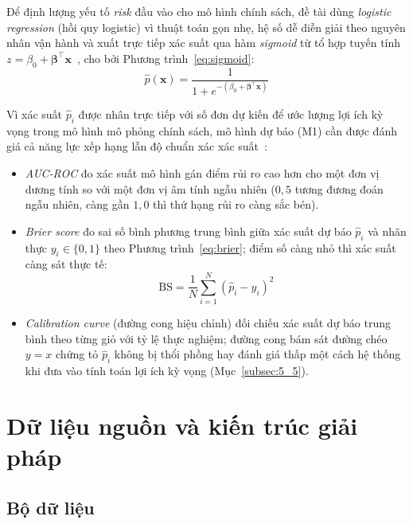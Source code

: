 \documentclass[a4paper]{article}
\begin{document}
Để định lượng yếu tố \textit{risk} đầu vào cho mô hình chính sách, đề tài dùng \textit{logistic regression} (hồi quy logistic) vì thuật toán gọn nhẹ, hệ số dễ diễn giải theo nguyên nhân vận hành và xuất trực tiếp xác suất qua hàm \textit{sigmoid} từ tổ hợp tuyến tính $z = \beta_0 + \boldsymbol{\beta}^\top \mathbf{x}$~\cite{bib:sklearn}, cho bởi Phương trình~\eqref{eq:sigmoid}:
\begin{equation}
\label{eq:sigmoid}
\hat{p}(\mathbf{x}) = \frac{1}{1 + e^{-(\beta_0 + \boldsymbol{\beta}^\top \mathbf{x})}}
\end{equation}

Vì xác suất $\hat{p}_i$ được nhân trực tiếp với số đơn dự kiến để ước lượng lợi ích kỳ vọng trong mô hình mô phỏng chính sách, mô hình dự báo (M1) cần được đánh giá cả năng lực xếp hạng lẫn độ chuẩn xác xác suất~\cite{bib:sklearn}:
\begin{itemize}
  \item \textit{AUC-ROC} đo xác suất mô hình gán điểm rủi ro cao hơn cho một đơn vị dương tính so với một đơn vị âm tính ngẫu nhiên ($0{,}5$ tương đương đoán ngẫu nhiên, càng gần $1{,}0$ thì thứ hạng rủi ro càng sắc bén).
  \item \textit{Brier score} đo sai số bình phương trung bình giữa xác suất dự báo $\hat{p}_i$ và nhãn thực $y_i \in \{0, 1\}$ theo Phương trình~\eqref{eq:brier}; điểm số càng nhỏ thì xác suất càng sát thực tế:
  \begin{equation}
  \label{eq:brier}
  \mathrm{BS} = \frac{1}{N}\sum_{i=1}^{N}(\hat{p}_i - y_i)^2
  \end{equation}
  \item \textit{Calibration curve} (đường cong hiệu chỉnh) đối chiếu xác suất dự báo trung bình theo từng giỏ với tỷ lệ thực nghiệm; đường cong bám sát đường chéo $y = x$ chứng tỏ $\hat{p}_i$ không bị thổi phồng hay đánh giá thấp một cách hệ thống khi đưa vào tính toán lợi ích kỳ vọng (Mục~\ref{subsec:5_5}).
\end{itemize}



\section{Dữ liệu nguồn và kiến trúc giải pháp}
\label{sec:ch3}

\subsection{Bộ dữ liệu}
\label{subsec:3_1}
\end{document}
